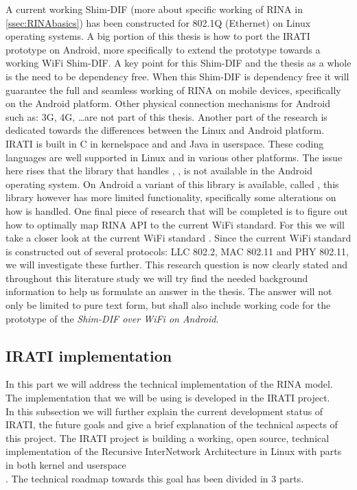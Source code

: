 A current working Shim-DIF (more about specific working of RINA in \ref{ssec:RINAbasics}) has been constructed for 802.1Q (Ethernet) on Linux operating systems. A big portion of this thesis is how to port the IRATI prototype on Android, more specifically to extend the prototype towards a working WiFi Shim-DIF. A key point for this Shim-DIF and the thesis as a whole is the need to be dependency free. When this Shim-DIF is dependency free it will guarantee the full and seamless working of RINA on mobile devices, specifically on the Android platform. Other physical connection mechanisms for Android such as: 3G, 4G, \ldots are not part of this thesis.
\npar
Another part of the research is dedicated towards the differences between the Linux and Android platform. IRATI is built in C in kernelspace and \cpp and Java in userspace.  These coding languages are well supported in Linux and in various other platforms. The issue here rises that the library that handles \cpp, , is not available in the Android operating system. On Android a variant of this library is available, called , this library however has more limited functionality, specifically some alterations on how \cpp is handled.
\npar
One final piece of research that will be completed is to figure out how to optimally map RINA API to the current WiFi standard. For this we will take a closer look at the current WiFi standard \citep{eldadperahia2008, sixtoortiz2009, thomaspaul2008}. Since the current WiFi standard is constructed out of several protocols: LLC 802.2, MAC 802.11 and PHY 802.11, we will investigate these further. 
\npar
This research question is now clearly stated and throughout this literature study we will try find the needed background information to help us formulate an answer in the thesis. The answer will not only be limited to pure text form, but shall also include working code for the prototype of the \emph{Shim-DIF over WiFi on Android}. 





\subsection{IRATI implementation}

In this part we will address the technical implementation of the RINA model. The implementation that we will be using is developed in the IRATI project. 
\\
In this subsection we will further explain the current development status of IRATI, the future goals and give a brief explanation of the technical aspects of this project.
\npar
The IRATI project is building a working, open source, technical implementation of the Recursive InterNetwork Architecture in Linux with parts in both kernel and userspace \\ \citep{website:IRATI-obj}. The technical roadmap towards this goal has been divided in 3 parts. 

